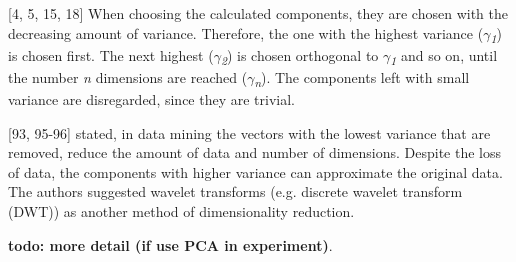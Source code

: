 \textcite{hotelling1933analysis}[4, 5, 15, 18] When choosing the calculated components, they are chosen with the decreasing amount of variance. Therefore, the one with the highest variance (\textit{$\gamma$\textsubscript{1}}) is chosen first. The next highest (\textit{$\gamma$\textsubscript{2}}) is chosen orthogonal to \textit{$\gamma$\textsubscript{1}} and so on, until the number \textit{n} dimensions are reached (\textit{$\gamma$\textsubscript{n}}). The components left with small variance are disregarded, since they are trivial. 



\textcite{han2011data}[93, 95-96] stated, in data mining the vectors with the lowest variance that are removed, reduce the amount of data and number of dimensions. Despite the loss of data, the components with higher variance can approximate the original data. The authors suggested wavelet transforms (e.g. discrete wavelet transform (DWT)) as another method of dimensionality reduction.


\textbf{todo: more detail (if use PCA in experiment)}.


